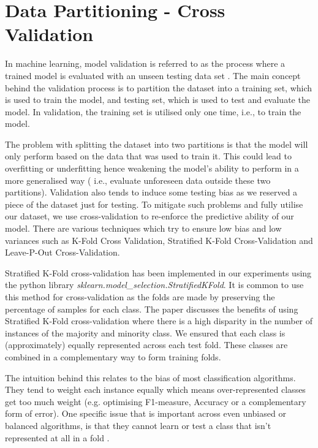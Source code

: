 \label{chap:Methodologies}

\section{Data Partitioning - Cross Validation}

In machine learning, model validation is referred to as the process where a trained model is evaluated with an unseen testing data set \cite{ Wang2013}. The main concept behind the validation process is to partition the dataset into a training set, which is used to train the model, and testing set, which is used to test and evaluate the model. In validation, the training set is utilised only one time, i.e., to train the model.

The problem with splitting the dataset into two partitions is that the model will only perform based on the data that was used to train it. This could lead to overfitting or underfitting hence weakening the model's ability to perform in a more generalised way ( i.e., evaluate unforeseen data outside these two partitions). Validation also tends to induce some testing bias as we reserved a piece of the dataset just for testing. To mitigate such problems and fully utilise our dataset, we use cross-validation to re-enforce the predictive ability of our model. There are various techniques which try to ensure low bias and low variances such as K-Fold Cross Validation, Stratified K-Fold Cross-Validation and Leave-P-Out Cross-Validation. 

Stratified K-Fold cross-validation has been implemented in our experiments using the python library \textit{sklearn.model\_selection.StratifiedKFold}. It is common to use this method for cross-validation as the folds are made by preserving the percentage of samples for each class.  The paper \cite{sinkey1975multivariate} discusses the benefits of using Stratified K-Fold cross-validation where there is a high disparity in the number of instances of the majority and minority class.
We ensured that each class is (approximately) equally represented across each test fold. These classes are combined in a complementary way to form training folds.

The intuition behind this relates to the bias of most classification algorithms. They tend to weight each instance equally which means over-represented classes get too much weight (e.g. optimising F1-measure, Accuracy or a complementary form of error). 
One specific issue that is important across even unbiased or balanced algorithms, is that they cannot learn or test a class that isn't represented at all in a fold {\cite{sinkey1975multivariate}}.

